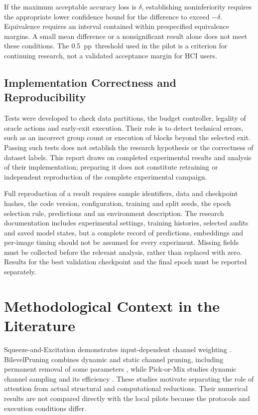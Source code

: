 \documentclass[12pt,a4paper]{article}
\newcommand{\pp}{pp}
\begin{document}
If the maximum acceptable accuracy loss is $\delta$, establishing
noninferiority requires the appropriate lower confidence bound
for the difference to exceed $-\delta$.
Equivalence requires an interval contained within prespecified equivalence
margins. A small mean difference or a nonsignificant result alone
does not meet these conditions.
The 0.5~\pp\ threshold used in the pilot is a criterion for continuing
research, not a validated acceptance margin for HCI users.

\subsection{Implementation Correctness and Reproducibility}

Tests were developed to check data partitions, the budget controller,
legality of oracle actions and early-exit execution.
Their role is to detect technical errors, such as an incorrect group
count or execution of blocks beyond the selected exit.
Passing such tests does not establish the research hypothesis or
the correctness of dataset labels.
This report draws on completed experimental results and analysis of their implementation;
preparing it does not constitute retraining or independent reproduction
of the complete experimental campaign.

Full reproduction of a result requires sample identifiers, data and
checkpoint hashes, the code version, configuration, training and split
seeds, the epoch selection rule, predictions and an environment description.
The research documentation includes experimental settings, training histories,
selected audits and saved model states,
but a complete record of predictions, embeddings and per-image timing
should not be assumed for every experiment.
Missing fields must be collected before the relevant analysis,
rather than replaced with zero.
Results for the best validation checkpoint and the final epoch must
be reported separately.

\section{Methodological Context in the Literature}

Squeeze-and-Excitation demonstrates input-dependent channel weighting
\cite{senet}.
BilevelPruning combines dynamic and static channel pruning, including
permanent removal of some parameters \cite{bilevel},
while Pick-or-Mix studies dynamic channel sampling and its efficiency
\cite{pix}.
These studies motivate separating the role of attention from actual
structural and computational reductions.
Their numerical results are not compared directly with the local pilots
because the protocols and execution conditions differ.
\end{document}
